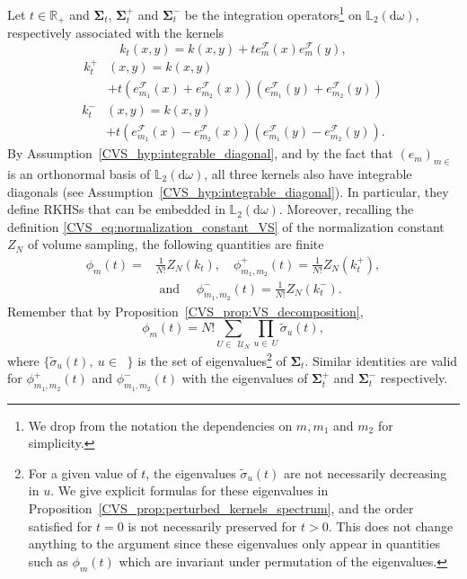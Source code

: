 \documentclass[twoside,11pt]{book}
\numberwithin{theorem}{chapter}
\numberwithin{definition}{chapter}
\numberwithin{proposition}{chapter}
\numberwithin{corollary}{chapter}
\numberwithin{example}{chapter}
\numberwithin{lemma}{chapter}
\numberwithin{assumption}{chapter}
\numberwithin{equation}{chapter}
\numberwithin{figure}{chapter}
\DeclareMathOperator{\F}{\mathcal{F}}
\DeclareMathOperator{\X}{\mathcal{X}}
\def\Ltwo{\mathbb{L}_{2}(\mathrm{d} \omega)}
\DeclareMathOperator{\Ns}{\mathbb{N}^{*}}
\def\UN{\:\mathcal{U}_N}
\begin{document}
Let $t\in\mathbb{R}_{+}$ and $\bm{\Sigma}_{t}$, $\bm{\Sigma}_{t}^{+}$ and $\bm{\Sigma}_{t}^{-}$ be the integration operators\footnote{We drop from the notation the dependencies on $m,m_{1}$ and $m_{2}$ for simplicity.} on $\Ltwo$, respectively associated with the kernels
\begin{equation}\label{CVS_eq:k_t}
k_{t}(x,y) = k(x,y) + t e_{m}^{\F}(x) e_{m}^{\F}(y),
\end{equation}
\begin{align}\label{CVS_eq:k_t_plus}
k_{t}^{+}&(x,y) = k(x,y)  \\
& + t \left( e_{m_{1}}^{\F}(x) + e_{m_{2}}^{\F}(x) \right) \left( e_{m_{1}}^{\F}(y) + e_{m_{2}}^{\F}(y) \right)\nonumber
\end{align}
\begin{align}\label{CVS_eq:k_t_minus}
k_{t}^{-}&(x,y) = k(x,y)\\
& + t \left( e_{m_{1}}^{\F}(x) - e_{m_{2}}^{\F}(x) \right) \left( e_{m_{1}}^{\F}(y) - e_{m_{2}}^{\F}(y) \right) \nonumber.
\end{align}
By Assumption~\ref{CVS_hyp:integrable_diagonal}, and by the fact that $(e_{m})_{m \in \Ns}$ is an orthonormal basis of $\Ltwo$, all three kernels also have integrable diagonals (see Assumption~\ref{CVS_hyp:integrable_diagonal}).
In particular, they define RKHSs that can be embedded in $\Ltwo$. Moreover, recalling the definition \eqref{CVS_eq:normalization_constant_VS} of the normalization constant $Z_{N}$ of volume sampling, the following quantities are finite
\begin{align}
\phi_{m}(t) = & \frac{1}{N!} Z_{N}(k_{t}) , \quad\phi_{m_{1},m_{2}}^{+}(t) = \frac{1}{N!} Z_{N}(k_{t}^{+}),\nonumber\\  &\text{ and }\quad \phi_{m_{1},m_{2}}^{-}(t) = \frac{1}{N!} Z_{N}(k_{t}^{-}).
\end{align}
Remember that by Proposition~\ref{CVS_prop:VS_decomposition},
\begin{equation}\label{CVS_eq:Z_kt}
\phi_{m}(t) = N! \sum\limits_{U \in \: \UN} \prod\limits_{u \in \: U} \tilde{\sigma}_{u}(t),
\end{equation}
where $\displaystyle \{\tilde{\sigma}_{u}(t), \: u \in \Ns\}$ is the set of eigenvalues\footnote{For a given value of $t$, the eigenvalues $\tilde{\sigma}_{u}(t)$ are not necessarily decreasing in $u$. We give explicit formulas for these eigenvalues in Proposition~\ref{CVS_prop:perturbed_kernels_spectrum}, and the order satisfied for $t=0$ is not necessarily preserved for $t>0$. This does not change anything to the argument since these eigenvalues only appear in quantities such as $\phi_{m}(t)$ which are invariant under permutation of the eigenvalues.} of $\bm{\Sigma}_{t}$. Similar identities are valid for $\phi_{m_{1},m_{2}}^{+}(t)$ and $\phi_{m_{1},m_{2}}^{-}(t)$ with the eigenvalues of $\bm{\Sigma}_{t}^{+}$ and $\bm{\Sigma}_{t}^{-}$ respectively.
\end{document}
